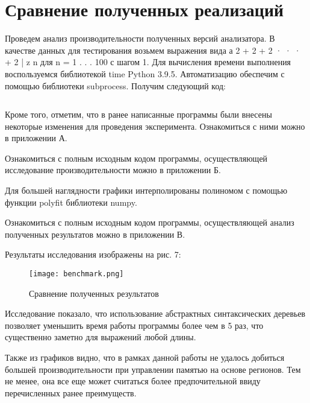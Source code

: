 \section{Сравнение полученных реализаций}
Проведем анализ производительности полученных версий анализатора. В
качестве данных для тестирования возьмем выражения вида а 2 + 2 + 2 · · · + 2
| {z }
n
для n = 1 . . . 100 с шагом 1. Для вычисления времени выполнения воспользуемся библиотекой time Python 3.9.5. Автоматизацию обеспечим с помощью
библиотеки subprocess. Получим следующий код:

\inputminted{python}{requirements/src/test.py}

Кроме того, отметим, что в ранее написанные программы были внесены некоторые изменения для проведения эксперимента. Ознакомиться с ними
можно в приложении А.

Ознакомиться с полным исходным кодом программы, осуществляющей
исследование производительности можно в приложении Б.

Для большей наглядности графики интерполированы полиномом с помощью функции polyfit библиотеки numpy.

Ознакомиться с полным исходным кодом программы, осуществляющей
анализ полученных результатов можно в приложении В.

Результаты исследования изображены на рис. 7:

\begin{figure}[h!]
    \centering
    \texttt{[image: benchmark.png]}
    \caption{Сравнение полученных результатов}
    \label{fig:seven}
\end{figure}

Исследование показало, что использование абстрактных синтаксических
деревьев позволяет уменьшить время работы программы более чем в 5 раз, что
существенно заметно для выражений любой длины.

Также из графиков видно, что в рамках данной работы не удалось добиться большей производительности при управлении памятью на основе регионов.
Тем не менее, она все еще может считаться более предпочительной ввиду перечисленных ранее преимуществ.
